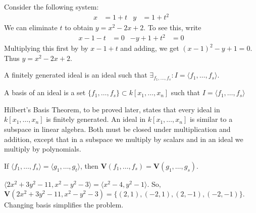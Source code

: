                 \begin{example}
                    Consider the following system:
                    \begin{align*}
                        x&=1+t&y&=1+t^{2}
                    \end{align*}
                    We can eliminate $t$ to
                    obtain $y=x^2-2x+2$. To see this, write
                    \begin{align*}
                        x-1-t&=0&-y+1+t^{2}&=0
                    \end{align*}
                    Multiplying this first by by $x-1+t$
                    and adding, we get $(x-1)^2-y+1=0$.
                    Thus $y=x^2-2x+2$.
                \end{example}
                \begin{definition}
                    A finitely generated ideal is an ideal
                    such that
                    $\exists_{f_1,\hdots, f_s}:I=\langle f_1,\hdots, f_s\rangle$.
                \end{definition}
                \begin{definition}
                    A basis of an ideal is a set
                    $\{f_1,\hdots, f_s\}\subset k[x_1,\hdots ,x_n]$
                    such that $I=\langle f_{1},\hdots,f_{s}\rangle$
                \end{definition}
                Hilbert's Basis Theorem, to be proved later, states
                that every ideal in $k[x_{1},\hdots,x_{n}]$ is finitely
                generated. An ideal in $k[x_{1},\hdots,x_{n}]$ is similar
                to a subspace in linear algebra. Both must be closed
                under multiplication and addition, except that in a
                subspace we multiply by scalars and in an ideal
                we multiply by polynomials. 
                \begin{theorem}
                    If $\langle f_1,\hdots,f_s\rangle=\langle g_1,\hdots,g_t\rangle$,
                    then $\mathbf{V}(f_1,\hdots, f_s)=\mathbf{V}(g_1,\hdots, g_s)$.
                \end{theorem}
                \begin{example}
                    $\langle2x^2+3y^2-11,x^2-y^2-3\rangle%
                     =\langle x^2-4,y^2-1\rangle$.
                    So,
                    $\mathbf{V}(2x^2+3y^2-11,x^2-y^2-3)%
                     =\{(2,1),(-2,1),(2,-1),(-2,-1)\}$.
                    Changing basis simplifies the problem.
                \end{example}

